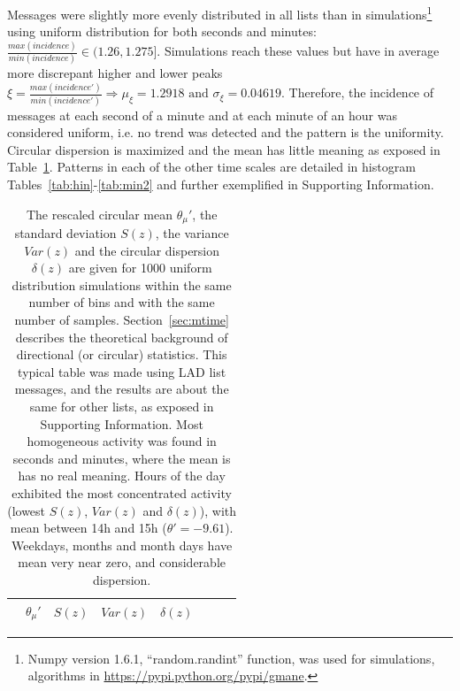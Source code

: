 \documentclass[%
 aip,
 jmp,%
 amsmath,amssymb,
 reprint,%
]{revtex4-1}
\begin{document}
Messages were slightly more evenly distributed in all lists than in simulations\footnote{Numpy version 1.6.1, ``random.randint'' function, was used for simulations, algorithms in \url{https://pypi.python.org/pypi/gmane}.} using uniform distribution for both seconds and minutes: $\frac{max(incidence)}{min(incidence)} \in (1.26,1.275]$. Simulations reach these values but have in average more discrepant higher and lower peaks $\xi=\frac{max(incidence')}{min(incidence')} \Rightarrow \mu_\xi=1.2918 \text{ and } \sigma_\xi=0.04619$.
Therefore, the incidence of messages at each second of a minute and at each minute of an hour was considered uniform, i.e. no trend was detected and the pattern is the uniformity. Circular dispersion is maximized and the mean has little meaning as exposed in Table~\ref{tab:circ}. Patterns in each of the other time scales are detailed in histogram Tables~\ref{tab:hin}-\ref{tab:min2} and further exemplified in Supporting Information.

\begin{table}
	\caption{The rescaled circular mean $\theta_\mu'$, the standard deviation $S(z)$, the variance $Var(z)$ and the circular dispersion $\delta(z)$ are given for 1000 uniform distribution simulations within the same number of bins and with the same number of samples. Section~\ref{sec:mtime} describes the theoretical background of directional (or circular) statistics. This typical table was made using LAD list messages, and the results are about the same for other lists, as exposed in Supporting Information. Most homogeneous activity was found in seconds and minutes, where the mean is has no real meaning. Hours of the day exhibited the most concentrated activity (lowest $S(z)$, $Var(z)$ and $\delta(z)$), with mean between 14h and 15h ($\theta'=-9.61$). Weekdays, months and month days have mean very near zero, and considerable dispersion.}
	\begin{center}
    \begin{tabular}{ |l|| c|c|c|c|c||c|c| }
        \hline
& $\theta_\mu'$ & $S(z)$ & $Var(z)$ & $\delta(z)$  \\ \hline\hline
	
    \end{tabular}
\end{center}
\label{tab:circ}
\end{table}
\end{document}
